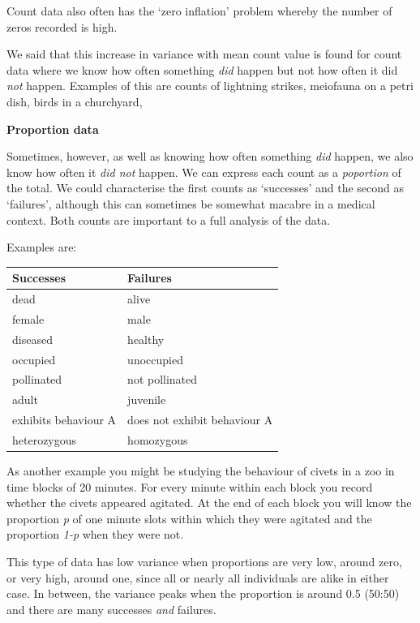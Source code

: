 \documentclass[
  letterpaper,
  DIV=11,
  numbers=noendperiod]{scrreprt}
\begin{document}
Count data also often has the `zero inflation' problem whereby the
number of zeros recorded is high.

We said that this increase in variance with mean count value is found
for count data where we know how often something \emph{did} happen but
not how often it did \emph{not} happen. Examples of this are counts of
lightning strikes, meiofauna on a petri dish, birds in a churchyard,

\textbf{Proportion data}

Sometimes, however, as well as knowing how often something \emph{did}
happen, we also know how often it \emph{did not} happen. We can express
each count as a \emph{poportion} of the total. We could characterise the
first counts as `successes' and the second as `failures', although this
can sometimes be somewhat macabre in a medical context. Both counts are
important to a full analysis of the data.

Examples are:

\begin{longtable}[]{@{}ll@{}}
\toprule\noalign{}
Successes & Failures \\
\midrule\noalign{}
\endhead
\bottomrule\noalign{}
\endlastfoot
dead & alive \\
female & male \\
diseased & healthy \\
occupied & unoccupied \\
pollinated & not pollinated \\
adult & juvenile \\
exhibits behaviour A & does not exhibit behaviour A \\
heterozygous & homozygous \\
\end{longtable}

As another example you might be studying the behaviour of civets in a
zoo in time blocks of 20 minutes. For every minute within each block you
record whether the civets appeared agitated. At the end of each block
you will know the proportion \emph{p} of one minute slots within which
they were agitated and the proportion \emph{1-p} when they were not.

This type of data has low variance when proportions are very low, around
zero, or very high, around one, since all or nearly all individuals are
alike in either case. In between, the variance peaks when the proportion
is around 0.5 (50:50) and there are many successes \emph{and} failures.
\end{document}
